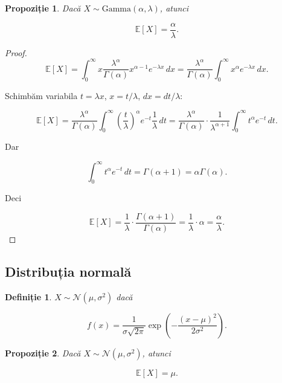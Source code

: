 \documentclass[12pt]{article}
\theoremstyle{plain}
\newtheorem{definition}{Definiție}
\newtheorem{proposition}{Propoziție}
\begin{document}
\begin{proposition}
Dacă $X \sim \mathrm{Gamma}(\alpha,\lambda)$, atunci


\[
\mathbb{E}[X] = \frac{\alpha}{\lambda}.
\]


\end{proposition}

\begin{proof}


\[
\mathbb{E}[X] = \int_0^{\infty} x \frac{\lambda^\alpha}{\Gamma(\alpha)} x^{\alpha-1} e^{-\lambda x}\, dx
= \frac{\lambda^\alpha}{\Gamma(\alpha)} \int_0^{\infty} x^{\alpha} e^{-\lambda x}\, dx.
\]


Schimbăm variabila $t = \lambda x$, $x = t/\lambda$, $dx = dt/\lambda$:


\[
\mathbb{E}[X] = \frac{\lambda^\alpha}{\Gamma(\alpha)}
\int_0^{\infty} \left(\frac{t}{\lambda}\right)^{\alpha} e^{-t} \frac{1}{\lambda}\, dt
= \frac{\lambda^\alpha}{\Gamma(\alpha)} \cdot \frac{1}{\lambda^{\alpha+1}}
\int_0^{\infty} t^{\alpha} e^{-t}\, dt.
\]


Dar


\[
\int_0^{\infty} t^{\alpha} e^{-t}\, dt = \Gamma(\alpha+1) = \alpha \Gamma(\alpha).
\]


Deci


\[
\mathbb{E}[X] = \frac{1}{\lambda} \cdot \frac{\Gamma(\alpha+1)}{\Gamma(\alpha)}
= \frac{1}{\lambda} \cdot \alpha = \frac{\alpha}{\lambda}.
\]


\end{proof}

\subsection{Distribuția normală}

\begin{definition}
$X \sim \mathcal{N}(\mu,\sigma^2)$ dacă


\[
f(x) = \frac{1}{\sigma \sqrt{2\pi}}
\exp\!\left( -\frac{(x - \mu)^2}{2\sigma^2} \right).
\]


\end{definition}

\begin{proposition}
Dacă $X \sim \mathcal{N}(\mu,\sigma^2)$, atunci


\[
\mathbb{E}[X] = \mu.
\]


\end{proposition}
\end{document}
